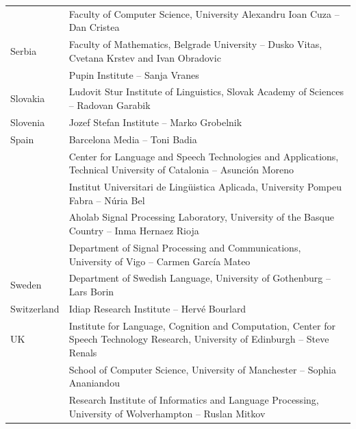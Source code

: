 \documentclass[]{../../metanetpaper}
\begin{document}
\begin{Parallel}[c]{80mm}{80mm}
\begin{tabular*}{\textwidth}{lp{13.5cm}}
  & Faculty of Computer Science, University Alexandru Ioan Cuza -- Dan Cristea \\
  Serbia & Faculty of Mathematics, Belgrade University -- Dusko Vitas, Cvetana Krstev and Ivan Obradovic \\
  & Pupin Institute -- Sanja Vranes \\ 
  Slovakia & Ludovit Stur Institute of Linguistics, Slovak Academy of Sciences -- Radovan Garabik \\ 
  Slovenia & Jozef Stefan Institute -- Marko Grobelnik \\ 
  Spain & Barcelona Media -- Toni Badia \\ 
  & Center for Language and Speech Technologies and Applications, Technical University of Catalonia -- Asunción Moreno \\ 
  & Institut Universitari de Lingüistica Aplicada, University Pompeu Fabra -- Núria Bel \\ 
  & Aholab Signal Processing Laboratory, University of the Basque Country -- Inma Hernaez Rioja \\ 
  & Department of Signal Processing and Communications, University of Vigo -- Carmen García Mateo \\ 
  Sweden & Department of Swedish Language, University of Gothenburg -- Lars Borin \\ 
  Switzerland & Idiap Research Institute -- Hervé Bourlard \\ 
  UK & Institute for Language, Cognition and Computation, Center for Speech Technology Research, University of Edinburgh -- Steve Renals \\ 
  & School of Computer Science, University of Manchester -- Sophia Ananiandou \\ 
  & Research Institute of Informatics and Language Processing, University of Wolverhampton -- Ruslan Mitkov \\ 
 \end{tabular*}



  
  

\ParallelPar
\end{Parallel}

\center
\end{document}
